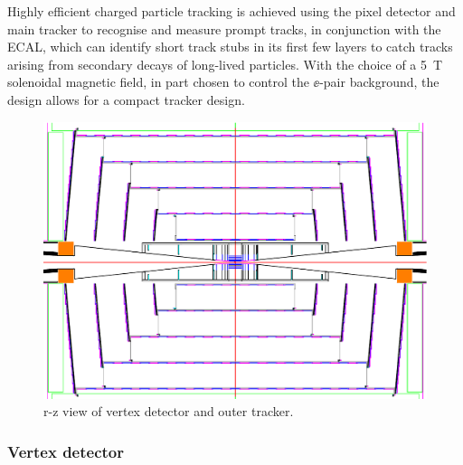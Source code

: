 Highly efficient charged particle tracking is achieved using the pixel detector
and main tracker to recognise and measure prompt tracks, in conjunction with the ECAL, which can
identify short track stubs in its first few layers 
to catch tracks arising from secondary decays of long-lived particles. With
the choice of a 5~T solenoidal magnetic field, in part chosen to control the $\ee$-pair
background, the design allows for a compact tracker design. 

\begin{figure}[tb]
 \begin{center}
 \includegraphics[width=0.9\hsize]{chapters/figures/vxdtrk.pdf}
\caption{r-z view of vertex detector and outer tracker.
\label{fig:fig_vxdtrk}}
 \end{center}
 \vspace{-0.7cm}
 \end{figure}

\subsubsection{Vertex detector}

